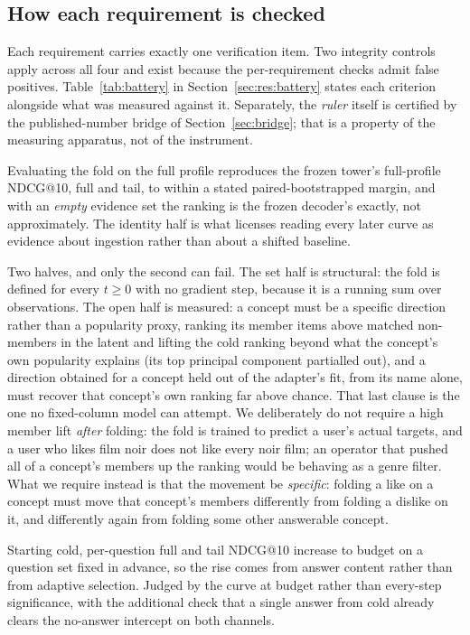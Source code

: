 \documentclass[manuscript,screen]{acmart}
\begin{document}
\subsection{How each requirement is checked}
Each requirement carries exactly one verification item. Two integrity controls apply across all four and exist because the per-requirement checks admit false positives. Table~\ref{tab:battery} in Section~\ref{sec:res:battery} states each criterion alongside what was measured against it. Separately, the \emph{ruler} itself is certified by the published-number bridge of Section~\ref{sec:bridge}; that is a property of the measuring apparatus, not of the instrument.

\begin{description}[leftmargin=2.4em,itemsep=1.5pt]
  \item[R1, full strength and identity.] Evaluating the fold on the full profile reproduces the frozen tower's full-profile NDCG@10, full and tail, to within a stated paired-bootstrapped margin, and with an \emph{empty} evidence set the ranking is the frozen decoder's exactly, not approximately. The identity half is what licenses reading every later curve as evidence about ingestion rather than about a shifted baseline.
  \item[R2, an open set-valued input interface.] Two halves, and only the second can fail. The set half is structural: the fold is defined for every $t\ge0$ with no gradient step, because it is a running sum over observations. The open half is measured: a concept must be a specific direction rather than a popularity proxy, ranking its member items above matched non-members in the latent and lifting the cold ranking beyond what the concept's own popularity explains (its top principal component partialled out), and a direction obtained for a concept held out of the adapter's fit, from its name alone, must recover that concept's own ranking far above chance. That last clause is the one no fixed-column model can attempt. We deliberately do not require a high member lift \emph{after} folding: the fold is trained to predict a user's actual targets, and a user who likes film noir does not like every noir film; an operator that pushed all of a concept's members up the ranking would be behaving as a genre filter. What we require instead is that the movement be \emph{specific}: folding a like on a concept must move that concept's members differently from folding a dislike on it, and differently again from folding some other answerable concept.
  \item[R3, monotonicity.] Starting cold, per-question full and tail NDCG@10 increase to budget on a question set fixed in advance, so the rise comes from answer content rather than from adaptive selection. Judged by the curve at budget rather than every-step significance, with the additional check that a single answer from cold already clears the no-answer intercept on both channels.

\end{description}
\end{document}
